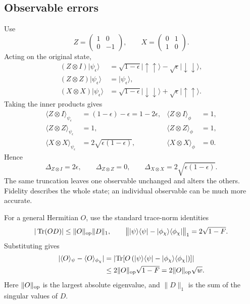 \documentclass[11pt]{article}
\newcommand{\ket}[1]{\lvert #1\rangle}
\newcommand{\bra}[1]{\langle #1\rvert}
\newcommand{\mtwo}[4]{\begin{pmatrix}#1&#2\\#3&#4\end{pmatrix}}
\begin{document}
\newpage
\subsection*{Observable errors}
Use
\begin{equation}
Z=\mtwo{1}{0}{0}{-1},\qquad X=\mtwo{0}{1}{1}{0}.
\end{equation}
Acting on the original state,
\begin{align}
(Z\otimes I)\ket{\psi_\epsilon}
&=\sqrt{1-\epsilon}\ket{\uparrow\uparrow}-\sqrt\epsilon\ket{\downarrow\downarrow},\\
(Z\otimes Z)\ket{\psi_\epsilon}&=\ket{\psi_\epsilon},\\
(X\otimes X)\ket{\psi_\epsilon}
&=\sqrt{1-\epsilon}\ket{\downarrow\downarrow}+\sqrt\epsilon\ket{\uparrow\uparrow}.
\end{align}
Taking the inner products gives
\begin{align}
\langle Z\otimes I\rangle_{\psi_\epsilon}&=(1-\epsilon)-\epsilon=1-2\epsilon,
&\langle Z\otimes I\rangle_\phi&=1,\\
\langle Z\otimes Z\rangle_{\psi_\epsilon}&=1,
&\langle Z\otimes Z\rangle_\phi&=1,\\
\langle X\otimes X\rangle_{\psi_\epsilon}&=2\sqrt{\epsilon(1-\epsilon)},
&\langle X\otimes X\rangle_\phi&=0.
\end{align}
Hence
\begin{equation}
\Delta_{Z\otimes I}=2\epsilon,\qquad
\Delta_{Z\otimes Z}=0,\qquad
\Delta_{X\otimes X}=2\sqrt{\epsilon(1-\epsilon)}.
\end{equation}
The same truncation leaves one observable unchanged and alters the others. Fidelity describes the whole state; an individual observable can be much more accurate.

For a general Hermitian $O$, use the standard trace-norm identities
\begin{equation}
|\operatorname{Tr}(O D)|\leq\|O\|_{\rm op}\|D\|_1,
\qquad
\bigl\|\ket{\psi}\bra{\psi}-\ket{\phi_\chi}\bra{\phi_\chi}\bigr\|_1
=2\sqrt{1-F}.
\end{equation}
Substituting gives
\begin{align}
|\langle O\rangle_\psi-\langle O\rangle_{\phi_\chi}|
&=\left|\operatorname{Tr}\!\left[O\left(\ket{\psi}\bra{\psi}
-\ket{\phi_\chi}\bra{\phi_\chi}\right)\right]\right|\\
&\leq2\|O\|_{\rm op}\sqrt{1-F}=2\|O\|_{\rm op}\sqrt w.
\end{align}
Here $\|O\|_{\rm op}$ is the largest absolute eigenvalue, and $\|D\|_1$ is the sum of the singular values of $D$.
\end{document}
